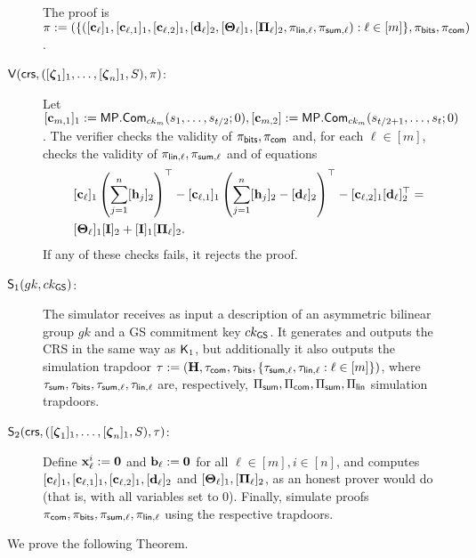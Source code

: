 \begin{description}
The proof is \(\pi:=(\{([\mathbf{c}_\ell]_1,[\mathbf{c}_{\ell,1}]_1,[\mathbf{c}_{\ell,2}]_1,[\mathbf{d}_\ell]_2,[\mathbf{{\Theta}}_\ell]_1,[\mathbf{{\Pi}}_\ell]_2,\pi_{\mathsf{lin},\ell},\pi_{\mathsf{sum},\ell}):\ell\in [m]\},\pi_{\mathsf{bits}},\pi_{\mathsf{com}})\).

\item[{\(\mathsf{V}(\mathsf{crs},([{\boldsymbol \zeta}_1]_1, \ldots, [{\boldsymbol \zeta}_n]_1,S),\pi)\)}:]
Let \([\mathbf{c}_{m,1}]_1:=\mathsf{MP}.\mathsf{Com}_{ck_m}(s_1,\ldots,s_{t /2};0),[\mathbf{c}_{m,2}]:=\mathsf{MP}.\mathsf{Com}_{ck_m}(s_{t /2+1},\ldots,s_{t };0)\). The verifier checks the validity of \(\pi_{\mathsf{bits}},\pi_{\mathsf{com}}\) 
and, for each \(\ell\in [m]\), checks the validity of \(\pi_{\mathsf{lin},\ell},\pi_{\mathsf{sum},\ell}\) and of equations
\begin{align}
&[\mathbf{c}_\ell]_1\left(\sum_{j=1}^n [\mathbf{h}_j]_2\right)^\top-
[\mathbf{c}_{\ell,1}]_1\left(\sum_{j=1}^n[\mathbf{h}_j]_2-[\mathbf{d}_\ell]_2\right)^\top-
[\mathbf{c}_{\ell,2}]_1[\mathbf{d}_\ell]_2^\top = \nonumber\\
&[\mathbf{{\Theta}}_\ell]_1[\mathbf{{I}}]_2+[\mathbf{{I}}]_1[\mathbf{{\Pi}}_\ell]_2. \label{eq-alog-5}
\end{align}
If any of these checks fails, it rejects the proof.

\item[{\(\mathsf{S}_1({gk},ck_{\mathsf{GS}})\):}] The simulator receives as input a description of an asymmetric bilinear group \({gk}\) and a GS commitment key $ck_{\mathsf{GS}}$. It generates and outputs the CRS in the same way as \(\mathsf{K}_1\), but additionally it also  outputs the simulation trapdoor 
\(\tau:=(\mathbf{{H}},\tau_{\mathsf{com}},\tau_{\mathsf{bits}},\{\tau_{\mathsf{sum},\ell},\tau_{\mathsf{lin},\ell}:\ell\in [m]\})\),
where \(\tau_{\mathsf{sum}},\tau_{\mathsf{bits}},\tau_{\mathsf{sum},\ell},\tau_{\mathsf{lin,\ell}}\) are, respectively, \({\Pi_{\mathsf{sum}}},{\Pi_{\mathsf{com}}},\Pi_{\mathsf{sum}},\Pi_\mathsf{lin}\) simulation trapdoors.

\item[{\(\mathsf{S}_2(\mathsf{crs},([{\boldsymbol \zeta}_1]_1,\ldots,[{\boldsymbol \zeta}_n]_1,S),\tau)\):}] Define \(\mathbf{x}_\ell^i:=\mathbf{0}\) and \(\mathbf{b}_\ell:=\mathbf{0}\) for all \(\ell\in [m],i\in[n]\), and computes \([\mathbf{c}_\ell]_1, [\mathbf{c}_{\ell,1}]_1,[\mathbf{c}_{\ell,2}]_1,[\mathbf{d}_\ell]_2\) and \([\mathbf{{\Theta}}_\ell]_1,[\mathbf{{\Pi}}_\ell]_2\), as an honest prover would do (that is, with all variables set to 0).
Finally, simulate proofs \(\pi_{\mathsf{com}},\pi_{\mathsf{bits}},\pi_{\mathsf{sum},\ell},\pi_{\mathsf{lin},\ell}\) using the respective trapdoors.
\end{description}

We prove the following Theorem.

